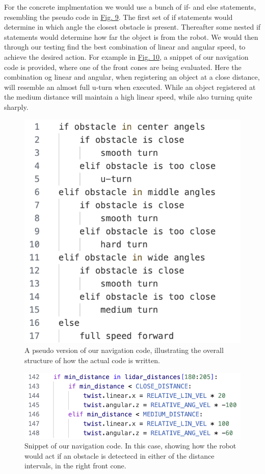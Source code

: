\documentclass[conference]{IEEEtran}
\begin{document}
For the concrete implmentation we would use a bunch of if- and else statements, resembling the pseudo code in \href{sec:pseudo}{Fig. 9}.
The first set of if statements would determine in which angle the closest obstacle is present.
Thereafter some nested if statements would determine how far the object is from the robot.
We would then through our testing find the best combination of linear and angular speed, to achieve the desired action.
For example in \href{sec:navigation}{Fig. 10}, a snippet of our navigation code is provided, where one of the front cones are being evaluated. 
Here the combination og linear and angular, when registering an object at a close distance, will resemble an almost full u-turn when executed.
While an object registered at the medium distance will maintain a high linear speed, while also turning quite sharply.

\begin{figure}[htbp]
    \centerline{\includegraphics[width=0.75\columnwidth\hspace{-0.5cm}]{Pictures/Pseudo.png}}
    \caption{A pseudo version of our navigation code, illustrating the overall structure of how the actual code is written.}
    \label{sec:pseudo}
    \end{figure}
\begin{figure}[htbp]
    \centerline{\includegraphics[width=1.0\columnwidth\hspace{0.0cm}]{Pictures/Navigation.png}}
    \caption{Snippet of our navigation code. 
    In this case, showing how the robot would act if an obstacle is detectecd in either of the distance intervals, in the right front cone.}
    \label{sec:navigation}
    \end{figure}
\end{document}
